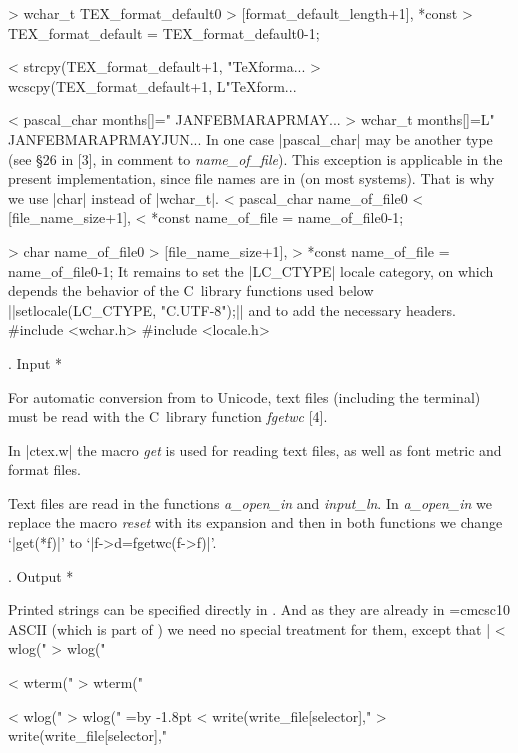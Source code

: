 > wchar_t TEX_format_default0
>   [format_default_length+1], *const
> TEX_format_default = TEX_format_default0-1;

< strcpy(TEX_format_default+1, "TeXforma...
> wcscpy(TEX_format_default+1, L"TeXform...

< pascal_char months[]=" JANFEBMARAPRMAY...
> wchar_t months[]=L" JANFEBMARAPRMAYJUN...
\endverbatim
In one case |pascal_char| may be another type
(see \S26 in [3], in comment to {\it name\_of\_file\/}).
This exception is applicable in the present implementation,
since file names are in  (on most systems).
That is why we use |char| instead of |wchar_t|.
\verbatim
< pascal_char name_of_file0
<             [file_name_size+1],
<   *const name_of_file = name_of_file0-1;

> char name_of_file0
>      [file_name_size+1],
>   *const name_of_file = name_of_file0-1;
\endverbatim
\medskip
It remains to set the |LC_CTYPE| locale category, on which
depends the behavior of the C~library functions used below
||setlocale(LC_CTYPE, "C.UTF-8");||
and to add the necessary headers.
\verbatim
#include <wchar.h>
#include <locale.h>
\endverbatim

. Input *

For automatic conversion from  to Unicode,
text files (including the terminal) must be
read with the C~library function \hbox{\it fgetwc\/} [4].

In |ctex.w| the macro {\it get\/}
is used for reading text files, as well as
font metric and format files.

Text files are read in the functions
{\it a\_open\_in\/} and
{\it input\_ln\/}.
In
{\it a\_open\_in\/} we replace the macro
{\it reset\/}
with its expansion and then in both functions
we change `|get(*f)|' to `|f->d=fgetwc(f->f)|'.

. Output *

Printed strings can be specified directly in .
And as they are already in {\font\rm=cmcsc10 \rm ASCII} (which is
part of )
we need no special treatment for them,
except that |%
\verbatim
< wlog("%c",months[k]);
> wlog("%lc",months[k]);

< wterm("%c",xchr[s]);
> wterm("%lc",xchr[s]);

< wlog("%c",xchr[s]);
> wlog("%lc",xchr[s]);
\endverbatim
\begingroup
\everyverbatim={\advance\parindent by -1.8pt }
\verbatim
< write(write_file[selector],"%c",xchr[s]);
> write(write_file[selector],"%lc",xchr[s]);
\endverbatim
\endgroup

